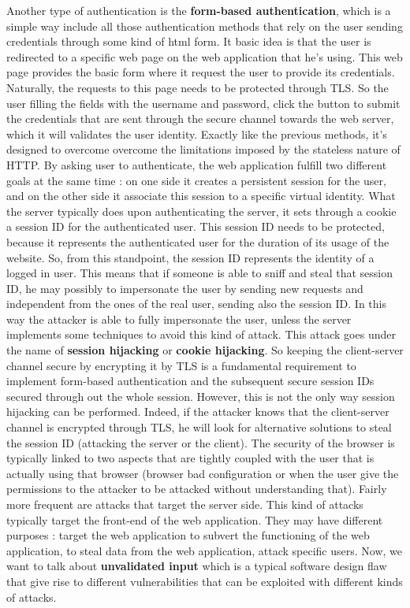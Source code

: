 Another type of authentication is the \textbf{form-based authentication}, which is a simple way include all those authentication methods that rely on the user sending credentials through some kind of html form. It basic idea is that the user is redirected to a specific web page on the web application that he's using. This web page provides the basic form where it request the user to provide its credentials. Naturally, the requests to this page needs to be protected through TLS. So the user filling the fields with the username and password, click the button to submit the credentials that are sent through the secure channel towards the web server, which it will validates the user identity. Exactly like the previous methods, it's designed to overcome overcome the limitations imposed by the stateless nature of HTTP. By asking user to authenticate, the web application fulfill two different goals at the same time : on one side it creates a persistent session for the user, and on the other side it associate this session to a specific virtual identity. What the server typically does upon authenticating the server, it sets through a cookie a session ID for the authenticated user. This session ID needs to be protected, because it represents the authenticated user for the duration of its usage of the website. So, from this standpoint, the session ID represents the identity of a logged in user. This means that if someone is able to sniff and steal that session ID, he may possibly to impersonate the user by sending new requests and independent from the ones of the real user, sending also the session ID. In this way the attacker is able to fully impersonate the user, unless the server implements some techniques to avoid this kind of attack. This attack goes under the name of \textbf{session hijacking} or \textbf{cookie hijacking}. So keeping the client-server channel secure by encrypting it by TLS is a fundamental requirement to implement form-based authentication and the subsequent secure session IDs secured through out the whole session. However, this is not the only way session hijacking can be performed. Indeed, if the attacker knows that the client-server channel is encrypted through TLS, he will look for alternative solutions to steal the session ID (attacking the server or the client). The security of the browser is typically linked to two aspects that are tightly coupled with the user that is actually using that browser (browser bad configuration or when the user give the permissions to the attacker to be attacked without understanding that). Fairly more frequent are attacks that target the server side. This kind of attacks typically target the front-end of the web application. They may have different purposes : target the web application to subvert the functioning of the web application, to steal data from the web application, attack specific users. Now, we want to talk about \textbf{unvalidated input} which is a typical software design flaw that give rise to different vulnerabilities that can be exploited with different kinds of attacks.


